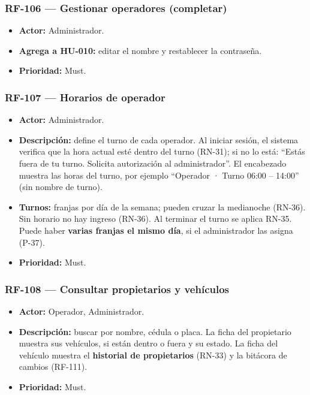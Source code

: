 \subsubsection{RF-106 — Gestionar operadores (completar)}
\begin{itemize}
  \item \textbf{Actor:} Administrador.
  \item \textbf{Agrega a HU-010:} editar el nombre y restablecer la contraseña.
  \item \textbf{Prioridad:} Must.
\end{itemize}

\subsubsection{RF-107 — Horarios de operador}
\begin{itemize}
  \item \textbf{Actor:} Administrador.
  \item \textbf{Descripción:} define el turno de cada operador. Al iniciar sesión, el sistema verifica que la hora actual esté dentro del turno (RN-31); si no lo está: ``Estás fuera de tu turno. Solicita autorización al administrador''. El encabezado muestra las horas del turno, por ejemplo ``Operador · Turno 06:00 – 14:00'' (sin nombre de turno).
  \item \textbf{Turnos:} franjas por día de la semana; pueden cruzar la medianoche (RN-36). Sin horario no hay ingreso (RN-36). Al terminar el turno se aplica RN-35. Puede haber \textbf{varias franjas el mismo día}, si el administrador las asigna (P-37).
  \item \textbf{Prioridad:} Must.
\end{itemize}

\subsubsection{RF-108 — Consultar propietarios y vehículos}
\begin{itemize}
  \item \textbf{Actor:} Operador, Administrador.
  \item \textbf{Descripción:} buscar por nombre, cédula o placa. La ficha del propietario muestra sus vehículos, si están dentro o fuera y su estado. La ficha del vehículo muestra el \textbf{historial de propietarios} (RN-33) y la bitácora de cambios (RF-111).
  \item \textbf{Prioridad:} Must.
\end{itemize}

